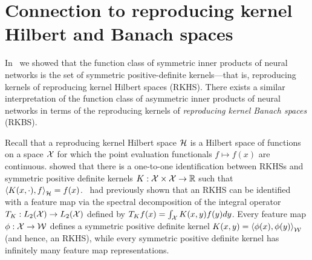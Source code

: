 \section{Connection to reproducing kernel Hilbert and Banach spaces}\label{sec:rkbs_asymmetric_relations}

In~ we showed that the function class of symmetric inner products of neural networks is the set of symmetric positive-definite kernels---that is, reproducing kernels of reproducing kernel Hilbert spaces (RKHS). There exists a similar interpretation of the function class of asymmetric inner products of neural networks in terms of the reproducing kernels of \textit{reproducing kernel Banach spaces} (RKBS).

Recall that a reproducing kernel Hilbert space ${\mathcal{H}}$ is a Hilbert space of functions on a space ${\mathcal{X}}$ for which the point evaluation functionals $f \mapsto f(x)$ are continuous. \citet{aronszajn1950theory} showed that there is a one-to-one identification between RKHSs and symmetric positive definite kernels $K: {\mathcal{X}} \times {\mathcal{X}} \to \mathbb{R}$ such that $\left \langle K(x, \cdot), f \right\rangle_{\mathcal{H}} = f(x)$.~\citet{mercerFunctionsPositive1909} had previously shown that an RKHS can be identified with a feature map via the spectral decomposition of the integral operator $T_K: L_2({\mathcal{X}}) \to L_2({\mathcal{X}})$ defined by $T_K f(x) = \int_{\mathcal{X}} K(x, y) f(y) dy$. Every feature map $\phi: {\mathcal{X}} \to {\mathcal{W}}$ defines a symmetric positive definite kernel $K(x, y) = \left \langle \phi(x), \phi(y) \right\rangle_{\mathcal{W}}$ (and hence, an RKHS), while every symmetric positive definite kernel has infinitely many feature map representations.

